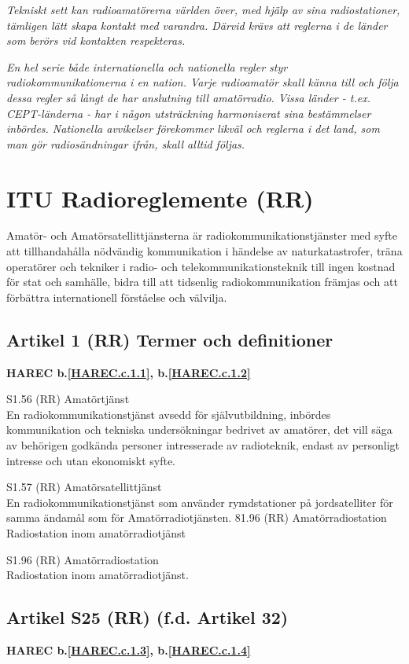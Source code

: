 \emph{Tekniskt sett kan radioamatörerna världen över, med hjälp av
  sina radiostationer, tämligen lätt skapa kontakt med
  varandra. Därvid krävs att reglerna i de länder som berörs vid
  kontakten respekteras.}

\emph{En hel serie både internationella och nationella regler styr
  radiokommunikationerna i en nation. Varje radioamatör skall känna
  till och följa dessa regler så långt de har anslutning till
  amatörradio. Vissa länder - t.ex. CEPT-länderna - har i någon
  utsträckning harmoniserat sina bestämmelser inbördes.  Nationella
  avvikelser förekommer likväl och reglerna i det land, som man gör
  radiosändningar ifrån, skall alltid följas.}

\section{ITU Radioreglemente (RR)}

Amatör- och Amatörsatellittjänsterna är radiokommunikationstjänster
med syfte att tillhandahålla nödvändig kommunikation i händelse av
naturkatastrofer, träna operatörer och tekniker i radio- och
telekommunikationsteknik till ingen kostnad för stat och samhälle,
bidra till att tidsenlig radiokommunikation främjas och att förbättra
internationell förståelse och välvilja.

\subsection{Artikel 1 (RR) Termer och definitioner}
\textbf{
HAREC b.\ref{HAREC.c.1.1}\label{myHAREC.c.1.1},
 b.\ref{HAREC.c.1.2}\label{myHAREC.c.1.2}
}

S1.56 (RR) Amatörtjänst \\
En radiokommunikationstjänst avsedd för självutbildning, inbördes
kommunikation och tekniska undersökningar bedrivet av amatörer, det
vill säga av behörigen godkända personer intresserade av radioteknik,
endast av personligt intresse och utan ekonomiskt syfte.

S1.57 (RR) Amatörsatellittjänst \\
En radiokommunikationstjänst som använder rymdstationer på
jordsatelliter för samma ändamål som för Amatörradiotjänsten.  81.96
(RR) Amatörradiostation Radiostation inom amatörradiotjänst

S1.96 (RR) Amatörradiostation \\
Radiostation inom amatörradiotjänst.

\subsection{Artikel S25 (RR) (f.d. Artikel 32)}
\textbf{
HAREC b.\ref{HAREC.c.1.3}\label{myHAREC.c.1.3},
 b.\ref{HAREC.c.1.4}\label{myHAREC.c.1.4}
}

